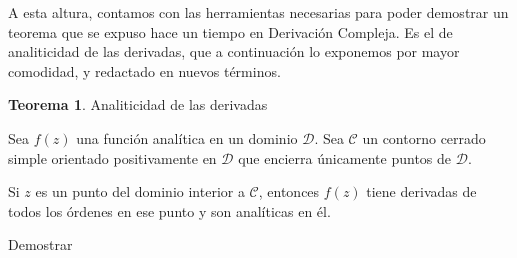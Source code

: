 \documentclass[12pt]{article}
\theoremstyle{definition}
\theoremstyle{theorem}
\newtheorem{theorem}{Teorema}[section]
\theoremstyle{corolary}
\begin{document}
A esta altura, contamos con las herramientas necesarias para poder demostrar un teorema que se expuso hace un tiempo en \textsf{Derivaci\'on Compleja}. Es el de analiticidad de las derivadas, que a continuaci\'on lo exponemos por mayor comodidad, y redactado en nuevos t\'erminos.\\

\colorbox{red!40!white!80}{\parbox{\linewidth}{
\theoremstyle{theorem}
\begin{theorem} {Analiticidad de las derivadas}

Sea $f(z)$  una funci\'on anal\'itica en un dominio $\mathcal{D}$. Sea $\mathcal{C}$ un contorno cerrado simple orientado positivamente en $\mathcal{D}$ que encierra \'unicamente puntos de $\mathcal{D}$.

Si $z$ es un punto del dominio interior a $\mathcal{C}$, entonces $f(z)$ tiene derivadas de todos los \'ordenes en ese punto y son anal\'iticas en \'el.

\end{theorem}}}
\linebreak

Demostrar\\
\end{document}

